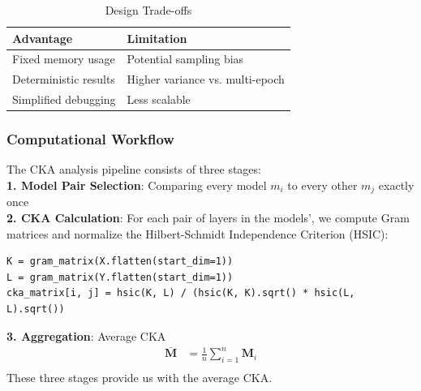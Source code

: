\begin{table}[h]
    \centering
    \begin{tabular}{ll}
        \hline
        \textbf{Advantage} & \textbf{Limitation} \\
        \hline
        Fixed memory usage & Potential sampling bias \\
        Deterministic results & Higher variance vs. multi-epoch \\
        Simplified debugging & Less scalable \\
        \hline
    \end{tabular}
    \caption{Design Trade-offs}
\end{table}

\subsubsection{Computational Workflow}

The CKA analysis pipeline consists of three stages:\\
\textbf{1. Model Pair Selection}: Comparing every model $m_i$ to every other $m_j$ exactly once 
\vspace{0.5em}\\
\textbf{2. CKA Calculation}: For each pair of layers in the models', we compute Gram matrices and normalize the Hilbert-Schmidt Independence Criterion (HSIC):
\begin{verbatim}
K = gram_matrix(X.flatten(start_dim=1))
L = gram_matrix(Y.flatten(start_dim=1))
cka_matrix[i, j] = hsic(K, L) / (hsic(K, K).sqrt() * hsic(L, L).sqrt())
\end{verbatim}
\vspace{0.5em}
\textbf{3. Aggregation}: Average CKA
\begin{align}
\bar{\mathbf{M}} &= \frac{1}{n}\sum_{i=1}^n \mathbf{M}_i \\
\end{align}
These three stages provide us with the average CKA.

